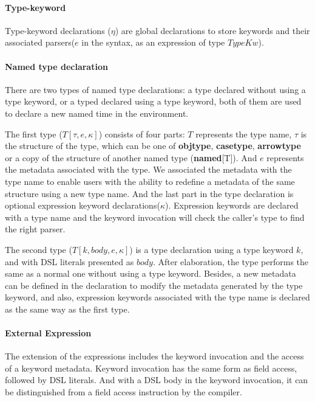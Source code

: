\documentclass{sig-alternate}
\begin{document}
\paragraph{Type-keyword}
Type-keyword declarations ($\eta$) are global declarations to store keywords and their associated parsers($e$ in the syntax, as an expression of type $TypeKw$).  

\paragraph{Named type declaration}
There are two types of named type declarations: a type declared without using a type keyword, or a typed declared using a type keyword, both of them are used to declare a new named time in the environment.

The first type ($T[\tau,e,\kappa]$) consists of four parts: $T$ represents the type name, $\tau$ is the structure of the type, which can be one of \textbf{objtype}, \textbf{casetype}, \textbf{arrowtype} or a copy of the structure of another named type (\textbf{named}[T]). And $e$ represents the metadata associated with the type. We associated the metadata with the type name to enable users with the ability to redefine a metadata of the same structure using a new type name. And the last part in the type declaration is optional expression keyword declarations($\kappa$). Expression keywords are declared with a type name and the keyword invocation will check the caller's type to find the right parser.

The second type ($T[k,body,e,\kappa]$) is a type declaration using a type keyword $k$, and with DSL literals presented as $body$. After elaboration, the type performs the same as a normal one without using a type keyword. Besides, a new metadata can be defined in the declaration to modify the metadata generated by the type keyword, and also, expression keywords associated with the type name is declared as the same way as the first type.

\paragraph{External Expression}
The extension of the expressions includes the keyword invocation and the access of a keyword metadata. Keyword invocation has the same form as field access, followed by DSL literals. And with a DSL body in the keyword invocation, it can be distinguished from a field access instruction by the compiler.
\end{document}
